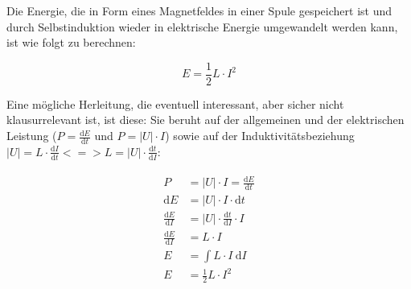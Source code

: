 Die Energie, die in Form eines Magnetfeldes in einer Spule gespeichert ist und durch Selbstinduktion wieder in elektrische Energie umgewandelt werden kann, ist wie folgt zu berechnen:

\begin{equation} \label{eq:EnergieSpule}
	E = \frac{1}{2} L \cdot I^2
\end{equation}

Eine mögliche Herleitung, die eventuell interessant, aber sicher nicht klausurrelevant ist, ist diese: Sie beruht auf der allgemeinen und der elektrischen Leistung ($P = \frac{\mathrm{d}E}{\mathrm{d}t}$ und $P = |U| \cdot I$) sowie auf der Induktivitätsbeziehung $|U| = L \cdot \frac{\mathrm{d}I}{\mathrm{d}t} <=> L = |U| \cdot \frac{\mathrm{d}t}{\mathrm{d}I}$:

\begin{align*}
\begin{split}
	P &= |U| \cdot I = \frac{\mathrm{d}E}{\mathrm{d}t} \\
	\mathrm{d}E &= |U| \cdot I \cdot \mathrm{d}t \\
	\frac{\mathrm{d}E}{\mathrm{d}I} &= |U| \cdot \frac{\mathrm{d}t}{\mathrm{d}I} \cdot I \\
	\frac{\mathrm{d}E}{\mathrm{d}I} &= L \cdot I \\
	E &= \int L \cdot I \ \mathrm{d}I \\
	E &= \frac{1}{2}L \cdot I^2
\end{split}
\end{align*}